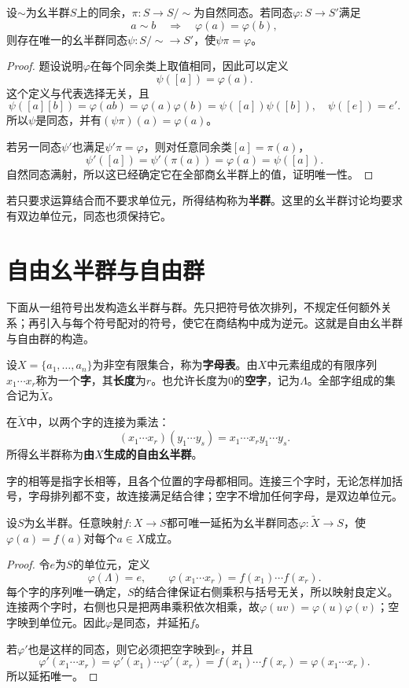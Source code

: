 \begin{theorem}\label{p2:monoid-factor}
设$\sim$为幺半群$S$上的同余，$\pi:S\to S/{\sim}$为自然同态。若同态$\varphi:S\to S'$满足
\[
a\sim b\quad\Longrightarrow\quad\varphi(a)=\varphi(b),
\]
则存在唯一的幺半群同态$\psi:S/{\sim}\to S'$，使$\psi\pi=\varphi$。
\end{theorem}
\begin{proof}
题设说明$\varphi$在每个同余类上取值相同，因此可以定义
\[
\psi([a])=\varphi(a).
\]
这个定义与代表选择无关，且
\[
\psi([a][b])=\varphi(ab)=\varphi(a)\varphi(b)=\psi([a])\psi([b]),
\quad\psi([e])=e'.
\]
所以$\psi$是同态，并有$(\psi\pi)(a)=\varphi(a)$。

若另一同态$\psi'$也满足$\psi'\pi=\varphi$，则对任意同余类$[a]=\pi(a)$，
\[
\psi'([a])=\psi'(\pi(a))=\varphi(a)=\psi([a]).
\]
自然同态满射，所以这已经确定它在全部商幺半群上的值，证明唯一性。
\end{proof}



若只要求运算结合而不要求单位元，所得结构称为\textbf{半群}。这里的幺半群讨论均要求有双边单位元，同态也须保持它。

\section{自由幺半群与自由群}

下面从一组符号出发构造幺半群与群。先只把符号依次排列，不规定任何额外关系；再引入与每个符号配对的符号，使它在商结构中成为逆元。这就是自由幺半群与自由群的构造。

\begin{definition}
设$X=\{a_1,\ldots,a_n\}$为非空有限集合，称为\textbf{字母表}。由$X$中元素组成的有限序列$x_1\cdots x_r$称为一个\textbf{字}，其\textbf{长度}为$r$。也允许长度为0的\textbf{空字}，记为$\Lambda$。全部字组成的集合记为$\widetilde X$。

在$\widetilde X$中，以两个字的连接为乘法：
\[
(x_1\cdots x_r)(y_1\cdots y_s)=x_1\cdots x_ry_1\cdots y_s.
\]
所得幺半群称为\textbf{由$X$生成的自由幺半群}。
\end{definition}

字的相等是指字长相等，且各个位置的字母都相同。连接三个字时，无论怎样加括号，字母排列都不变，故连接满足结合律；空字不增加任何字母，是双边单位元。

\begin{theorem}
设$S$为幺半群。任意映射$f:X\to S$都可唯一延拓为幺半群同态$\varphi:\widetilde X\to S$，使$\varphi(a)=f(a)$对每个$a\in X$成立。
\end{theorem}
\begin{proof}
令$e$为$S$的单位元，定义
\[
\varphi(\Lambda)=e,\qquad
\varphi(x_1\cdots x_r)=f(x_1)\cdots f(x_r).
\]
每个字的序列唯一确定，$S$的结合律保证右侧乘积与括号无关，所以映射良定义。连接两个字时，右侧也只是把两串乘积依次相乘，故$\varphi(uv)=\varphi(u)\varphi(v)$；空字映到单位元。因此$\varphi$是同态，并延拓$f$。

若$\varphi'$也是这样的同态，则它必须把空字映到$e$，并且
\[
\varphi'(x_1\cdots x_r)=\varphi'(x_1)\cdots\varphi'(x_r)
=f(x_1)\cdots f(x_r)=\varphi(x_1\cdots x_r).
\]
所以延拓唯一。
\end{proof}

